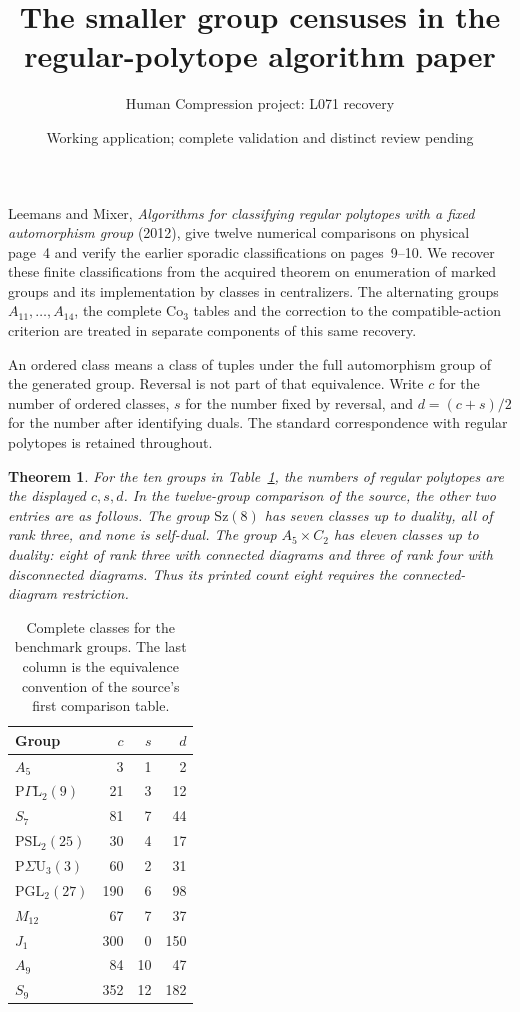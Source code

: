 \documentclass[11pt,a4paper]{article}
\title{The smaller group censuses in the regular-polytope algorithm paper}
\author{Human Compression project: L071 recovery}
\date{Working application; complete validation and distinct review pending}
\newtheorem{theorem}{Theorem}
\begin{document}
\maketitle
Leemans and Mixer, \emph{Algorithms for classifying regular polytopes
with a fixed automorphism group} (2012), give twelve numerical comparisons
on physical page~4 and verify the earlier sporadic classifications on
pages~9--10. We recover these finite classifications from the acquired
theorem on enumeration of marked groups and its implementation by classes
in centralizers. The alternating groups $A_{11},\ldots,A_{14}$, the
complete $\mathrm{Co}_3$ tables and the correction to the compatible-action
criterion are treated in separate components of this same recovery.

An ordered class means a class of tuples under the full automorphism
group of the generated group. Reversal is not part of that equivalence.
Write $c$ for the number of ordered classes, $s$ for the number fixed by
reversal, and $d=(c+s)/2$ for the number after identifying duals. The
standard correspondence with regular polytopes is retained throughout.

\begin{theorem}\label{bench}
For the ten groups in Table~\ref{benchmark}, the numbers of regular
polytopes are the displayed $c,s,d$. In the twelve-group comparison of
the source, the other two entries are as follows. The group $\mathrm{Sz}(8)$
has seven classes up to duality, all of rank three, and none is self-dual.
The group $A_5\times C_2$ has eleven classes up to duality: eight of rank
three with connected diagrams and three of rank four with disconnected
diagrams. Thus its printed count eight requires the connected-diagram
restriction.
\end{theorem}
\begin{table}[ht]
\centering
\begin{tabular}{lrrr}
\toprule Group & $c$ & $s$ & $d$\\\midrule
$A_5$ & 3 & 1 & 2\\
$\mathrm{P}\Gamma\mathrm L_2(9)$ & 21 & 3 & 12\\
$S_7$ & 81 & 7 & 44\\
$\mathrm{PSL}_2(25)$ & 30 & 4 & 17\\
$\mathrm{P}\Sigma\mathrm U_3(3)$ & 60 & 2 & 31\\
$\mathrm{PGL}_2(27)$ & 190 & 6 & 98\\
$M_{12}$ & 67 & 7 & 37\\
$J_1$ & 300 & 0 & 150\\
$A_9$ & 84 & 10 & 47\\
$S_9$ & 352 & 12 & 182\\
\bottomrule
\end{tabular}
\caption{Complete classes for the benchmark groups. The last column is
the equivalence convention of the source's first comparison table.}
\label{benchmark}
\end{table}
\end{document}
